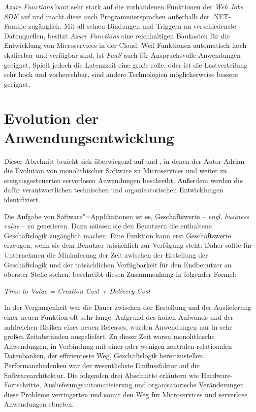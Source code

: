 \textit{Azure Functions} baut sehr stark auf die vorhandenen Funktionen der \textit{Web Jobs SDK} auf und macht diese auch Programmiersprachen außerhalb der .NET-Familie zugänglich. Mit all seinen Bindungen und Triggern an verschiedenste Datenquellen, besitzt \textit{Azure Functions} eine reichhaltigen Baukasten für die Entwicklung von Microservices in der Cloud. Weil Funktionen automatisch hoch skalierbar und verfügbar sind, ist \textit{FaaS} auch für Anspruchsvolle Anwendungen geeignet. Spielt jedoch die Latenzzeit eine große rolle, oder ist die Lastverteilung sehr hoch und vorhersehbar, sind andere Technologien möglicherweise bessere geeignet. 

\section{Evolution der Anwendungsentwicklung}

Dieser Abschnitt bezieht sich überwiegend auf \cite{Cock16EvoFunc} und \cite{Cock17ShrinkingMS}, in denen der Autor Adrian \citeauthor{Cock16EvoFunc} die Evolution von monolithischer Software zu Microservices und weiter zu ereignisgesteuerten serverlosen Anwendungen beschreibt. Außerdem werden die dafür verantwortlichen technischen und organisatorischen Entwicklungen identifiziert.

Die Aufgabe von Software"=Applikationen ist es, Geschäftswerte -- \textit{engl. business value} -- zu generieren. Dazu müssen sie den Benutzern die enthaltene Geschäftslogik zugänglich machen. Eine Funktion kann erst Geschäftswerte erzeugen, wenn sie dem Benutzer tatsächlich zur Verfügung steht. Daher sollte für Unternehmen die Minimierung der Zeit zwischen der Erstellung der Geschäftslogik und der tatsächlichen Verfügbarkeit für den Endbenutzer an oberster Stelle stehen. \citeauthor{Cock16EvoFunc} beschreibt diesen Zusammenhang in folgender Formel:

\begin{center}
\textit{Time to Value = Creation Cost + Delivery Cost}
\end{center}

In der Vergangenheit war die Dauer zwischen der Erstellung und der Auslieferung einer neuen Funktion oft sehr lange. Aufgrund des hohen Aufwands und der zahlreichen Risiken eines neuen Releases, wurden Anwendungen nur in sehr großen Zeitabständen ausgeliefert. Zu dieser Zeit waren monolithische Anwendungen, in Verbindung mit einer oder wenigen zentralen relationalen Datenbanken, der effizienteste Weg, Geschäftslogik bereitzustellen. Performanzbedenken war der wesentlichste Einflussfaktor auf die Softwarearchitektur. Die folgenden drei Abschnitte erläutern wie Hardware-Fortschritte, Auslieferungsautomatisierung und organisatorische Veränderungen diese Probleme verringerten und somit den Weg für Microservices und serverlose Anwendungen ebneten.

